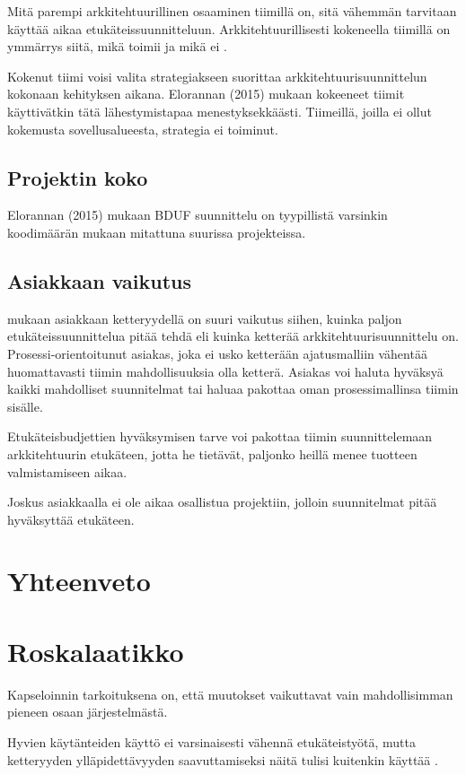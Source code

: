 Mitä parempi arkkitehtuurillinen osaaminen tiimillä on, sitä vähemmän tarvitaan käyttää aikaa etukäteissuunnitteluun. Arkkitehtuurillisesti kokeneella tiimillä on ymmärrys siitä, mikä toimii ja mikä ei \citep{waterman_how_2015}. 

Kokenut tiimi voisi valita strategiakseen suorittaa arkkitehtuurisuunnittelun kokonaan kehityksen aikana. Elorannan (2015) mukaan kokeeneet tiimit käyttivätkin tätä lähestymistapaa menestyksekkäästi. Tiimeillä, joilla ei ollut kokemusta sovellusalueesta, strategia ei toiminut.
\section{Projektin koko}

Elorannan (2015) mukaan BDUF suunnittelu on tyypillistä varsinkin koodimäärän mukaan mitattuna suurissa projekteissa. 

\section{Asiakkaan vaikutus}
\citep{waterman_how_2015} mukaan asiakkaan ketteryydellä on suuri vaikutus siihen, kuinka paljon etukäteissuunnittelua pitää tehdä eli kuinka ketterää arkkitehtuurisuunnittelu on. Prosessi-orientoitunut asiakas, joka ei usko ketterään ajatusmalliin vähentää huomattavasti tiimin mahdollisuuksia olla ketterä. Asiakas voi haluta hyväksyä kaikki mahdolliset suunnitelmat tai haluaa pakottaa oman prosessimallinsa tiimin sisälle. 

Etukäteisbudjettien hyväksymisen tarve voi pakottaa tiimin suunnittelemaan arkkitehtuurin etukäteen, jotta he tietävät, paljonko heillä menee tuotteen valmistamiseen aikaa. 

Joskus asiakkaalla ei ole aikaa osallistua projektiin, jolloin suunnitelmat pitää hyväksyttää etukäteen.
\chapter{Yhteenveto}
\chapter{Roskalaatikko}

Kapseloinnin tarkoituksena on, että muutokset vaikuttavat vain mahdollisimman pieneen osaan järjestelmästä. 

Hyvien käytänteiden käyttö ei varsinaisesti vähennä etukäteistyötä, mutta ketteryyden ylläpidettävyyden saavuttamiseksi näitä tulisi kuitenkin käyttää \citep{waterman_agility_2018_a}. 
